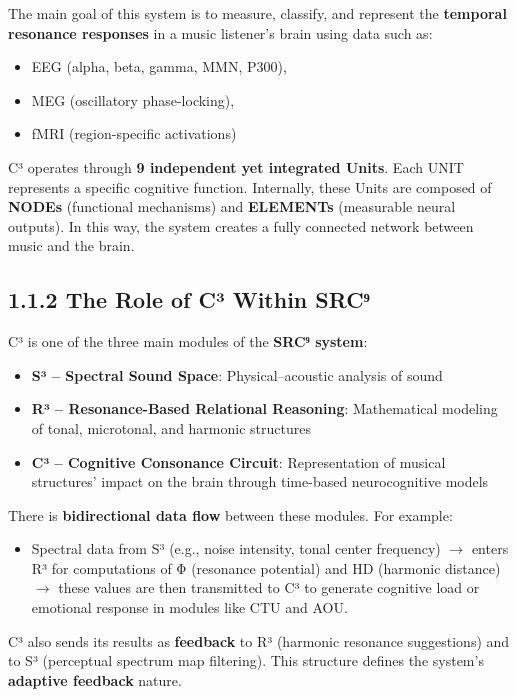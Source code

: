 \documentclass[10pt]{article}
\begin{document}
The main goal of this system is to measure, classify, and represent the \textbf{temporal resonance responses} in a music listener's brain using data such as:

\begin{itemize}
    \item EEG (alpha, beta, gamma, MMN, P300),
    \item MEG (oscillatory phase-locking),
    \item fMRI (region-specific activations)
\end{itemize}

C³ operates through \textbf{9 independent yet integrated Units}. Each UNIT represents a specific cognitive function. Internally, these Units are composed of \textbf{NODEs} (functional mechanisms) and \textbf{ELEMENTs} (measurable neural outputs). In this way, the system creates a fully connected network between music and the brain.

\subsection*{1.1.2 The Role of C³ Within SRC⁹}

C³ is one of the three main modules of the \textbf{SRC⁹ system}:

\begin{itemize}
    \item \textbf{S³ – Spectral Sound Space}: Physical–acoustic analysis of sound
    \item \textbf{R³ – Resonance-Based Relational Reasoning}: Mathematical modeling of tonal, microtonal, and harmonic structures
    \item \textbf{C³ – Cognitive Consonance Circuit}: Representation of musical structures' impact on the brain through time-based neurocognitive models
\end{itemize}

There is \textbf{bidirectional data flow} between these modules. For example:

\begin{itemize}
    \item Spectral data from S³ (e.g., noise intensity, tonal center frequency) $\rightarrow$ enters R³ for computations of Φ (resonance potential) and HD (harmonic distance) $\rightarrow$ these values are then transmitted to C³ to generate cognitive load or emotional response in modules like CTU and AOU.
\end{itemize}

C³ also sends its results as \textbf{feedback} to R³ (harmonic resonance suggestions) and to S³ (perceptual spectrum map filtering). This structure defines the system’s \textbf{adaptive feedback} nature.
\end{document}
